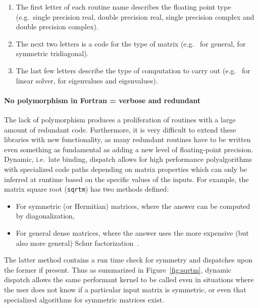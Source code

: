 \documentclass[pldi]{sigplanconf-pldi15}
\begin{document}
\begin{enumerate}
\item The first letter of each routine name describes the floating point type (e.g.\ single precision real, double precision real, single precision complex and double precision complex).

\item The next two letters is a code for the type of matrix (e.g.\  for general,  for symmetric tridiagonal).

\item The last few letters describe the type of computation to carry out (e.g.\  for linear solver,  for eigenvalues and eigenvalues).
\end{enumerate}

\paragraph{No polymorphism in Fortran = verbose and redundant}
The lack of polymorphism produces a proliferation of routines with a large
amount of redundant code. Furthermore, it is very difficult to extend these
libraries with new functionality, as many redundant routines have to be written
even something as fundamental as adding a new level of floating-point
precision. 
Dynamic, i.e.\ late binding, dispatch allows for high performance
polyalgorithms with specialized code paths depending on matrix properties which
can only be inferred at runtime based on the specific values of the inputs. For
example, the matrix square root (\verb|sqrtm|) has two methods defined:

\begin{itemize}
	\item For symmetric (or Hermitian) matrices, where the answer can be
		computed by diagonalization,
	\item For general dense matrices, where the answer uses the more
		expensive (but also more general) Schur
		factorization~\cite{Higham2008}.
\end{itemize}
%
The latter method contains a run time check for symmetry and dispatches upon
the former if present. Thus as summarized in Figure~\ref{fig:sqrtm}, dynamic
dispatch allows the same performant kernel to be called even in situations
where the user does not know if a particular input matrix is symmetric, or even
that specialized algorithms for symmetric matrices exist.
\end{document}
